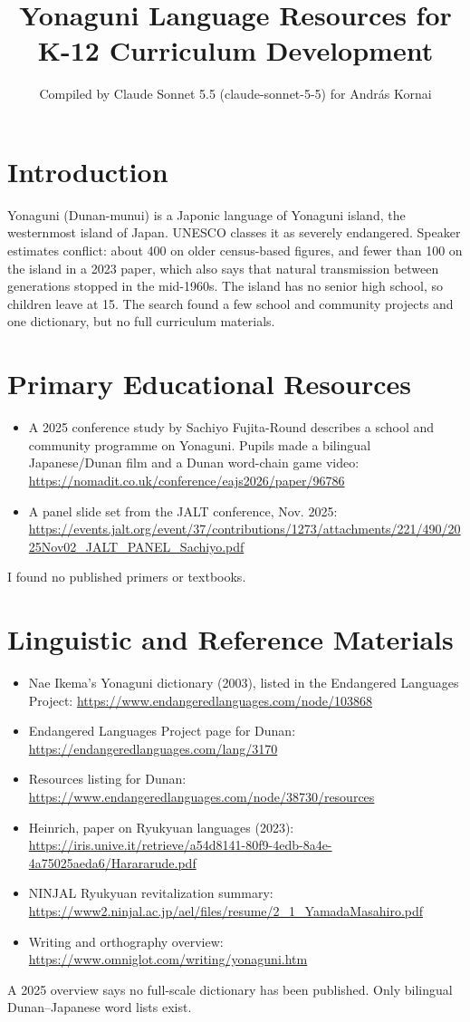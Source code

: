 \documentclass[12pt]{article}
\title{Yonaguni Language Resources for K-12 Curriculum Development}
\author{Compiled by Claude Sonnet 5.5 (claude-sonnet-5-5) for Andr\'as Kornai}
\date{}
\begin{document}
\maketitle

\section{Introduction}
Yonaguni (Dunan-munui) is a Japonic language of Yonaguni island, the westernmost island of Japan. UNESCO classes it as severely endangered. Speaker estimates conflict: about 400 on older census-based figures, and fewer than 100 on the island in a 2023 paper, which also says that natural transmission between generations stopped in the mid-1960s. The island has no senior high school, so children leave at 15. The search found a few school and community projects and one dictionary, but no full curriculum materials.

\section{Primary Educational Resources}
\begin{itemize}
\item A 2025 conference study by Sachiyo Fujita-Round describes a school and community programme on Yonaguni. Pupils made a bilingual Japanese/Dunan film and a Dunan word-chain game video: \url{https://nomadit.co.uk/conference/eajs2026/paper/96786}
\item A panel slide set from the JALT conference, Nov. 2025: \url{https://events.jalt.org/event/37/contributions/1273/attachments/221/490/2025Nov02_JALT_PANEL_Sachiyo.pdf}
\end{itemize}
I found no published primers or textbooks.

\section{Linguistic and Reference Materials}
\begin{itemize}
\item Nae Ikema's Yonaguni dictionary (2003), listed in the Endangered Languages Project: \url{https://www.endangeredlanguages.com/node/103868}
\item Endangered Languages Project page for Dunan: \url{https://endangeredlanguages.com/lang/3170}
\item Resources listing for Dunan: \url{https://www.endangeredlanguages.com/node/38730/resources}
\item Heinrich, paper on Ryukyuan languages (2023): \url{https://iris.unive.it/retrieve/a54d8141-80f9-4edb-8a4e-4a75025aeda6/Harararude.pdf}
\item NINJAL Ryukyuan revitalization summary: \url{https://www2.ninjal.ac.jp/ael/files/resume/2_1_YamadaMasahiro.pdf}
\item Writing and orthography overview: \url{https://www.omniglot.com/writing/yonaguni.htm}
\end{itemize}
A 2025 overview says no full-scale dictionary has been published. Only bilingual Dunan--Japanese word lists exist.
\end{document}
